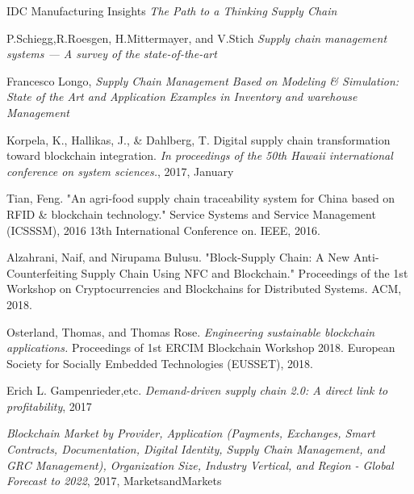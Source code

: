 \begin{thebibliography}{99}
 IDC Manufacturing Insights \textit{The Path to a Thinking Supply Chain}

 P.Schiegg,R.Roesgen, H.Mittermayer,
and V.Stich  \textit{Supply chain management systems --- A survey of the state-of-the-art}

 Francesco Longo, \textit{Supply Chain Management Based on Modeling \& Simulation: State of the Art and Application Examples in Inventory and warehouse Management}

 Korpela, K., Hallikas, J., \& Dahlberg, T. Digital supply chain transformation toward blockchain integration. \textit{In proceedings of the 50th Hawaii international conference on system sciences.}, 2017, January

 Tian, Feng. "An agri-food supply chain traceability system for China based on RFID \& blockchain technology." Service Systems and Service Management (ICSSSM), 2016 13th International Conference on. IEEE, 2016.

 Alzahrani, Naif, and Nirupama Bulusu. "Block-Supply Chain: A New Anti-Counterfeiting Supply Chain Using NFC and Blockchain." Proceedings of the 1st Workshop on Cryptocurrencies and Blockchains for Distributed Systems. ACM, 2018.

 Osterland, Thomas, and Thomas Rose. \textit{Engineering sustainable blockchain applications.} Proceedings of 1st ERCIM Blockchain Workshop 2018. European Society for Socially Embedded Technologies (EUSSET), 2018.

 Erich L. Gampenrieder,etc. \textit{Demand-driven supply chain 2.0: A direct link to profitability}, 2017

 \textit{Blockchain Market by Provider, Application (Payments, Exchanges, Smart Contracts, Documentation, Digital Identity, Supply Chain Management, and GRC Management), Organization Size, Industry Vertical, and Region - Global Forecast to 2022}, 2017, MarketsandMarkets


\end{thebibliography}
